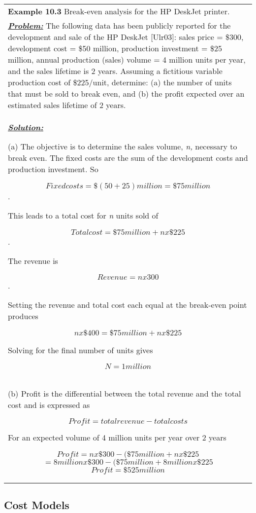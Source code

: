 \begin{table}
\begin{tabular}{m{15cm}||}
\textbf{Example 10.3} Break-even analysis for the HP DeskJet printer.\\

\emph{\textbf{\ul{Problem:}}} The following data has been publicly
reported for the development and sale of the HP DeskJet {[}Ulr03{]}:
sales price = \$300, development cost = \$50 million, production
investment = \$25 million, annual production (sales) volume = 4 million
units per year, and the sales lifetime is 2 years. Assuming a fictitious
variable production cost of \$225/unit, determine: (a) the number of
units that must be sold to break even, and (b) the profit expected over
an estimated sales lifetime of 2 years.\\

\emph{\textbf{\ul{Solution:}}}

(a) The objective is to determine the sales volume, \emph{n,} necessary
to break even. The fixed costs are the sum of the development costs and
production investment. So

$$Fixed costs = \$(50+25) million = \$75 million$$.

This leads to a total cost for \emph{n} units sold of

$$Totalcost = \$75 million + n x \$225$$.

The revenue is

$$Revenue = n x 300$$.

Setting the revenue and total cost each equal at the break-even point
produces

$$n x \$400 = \$75 million + n x \$225$$

Solving for the final number of units gives

$$N = 1 million$$\\

(b) Profit is the differential between the total revenue and the total
cost and is expressed as

$$ Profit = total revenue - total costs$$

For an expected volume of 4 million units per year over 2 years

$$Profit = n x \$300 - (\$ 75 million + n x \$225$$
$$   = 8 million x \$300 - (\$ 75 million + 8 million x \$225$$
$$Profit = \$525 million$$
\end{tabular}
\end{table}

\subsection{Cost Models}
\label{subsection:cost-models}

